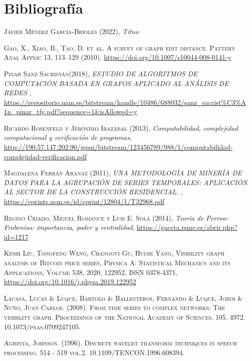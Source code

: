 \documentclass[12pt,a4paper]{article}
\begin{document}
	\section{Bibliografía}
	 \renewcommand\refname{}
\begin{thebibliography}{X}


 \textsc{Javier Méndez García-Brioles} \textsc{(2022)},
\textit{Tituo}

 \textsc{Gao, X., Xiao, B., Tao, D. et al. A survey of graph edit distance. Pattern Anal Applic 13, 113–129 (2010).} \url{https://doi.org/10.1007/s10044-008-0141-y}

 \textsc{ Pinar Sanz Sacristán}\textsc{(2018)},
\textit{ESTUDIO DE ALGORITMOS DE
COMPUTACIÓN BASADA EN
GRAFOS APLICADO AL
ANÁLISIS DE REDES
}, \url{https://repositorio.uam.es/bitstream/handle/10486/688032/sanz_sacrist%C3%A1n_pinar_tfg.pdf?sequence=1&isAllowed=y}

 \textsc{Ricardo Rosenfeld y Jerónimo Irazábal} \textsc{(2013)},
\textit{Computabilidad, complejidad
computacional y verificación
de programas}, \url{http://190.57.147.202:90/jspui/bitstream/123456789/988/1/computabilidad-complejidad-verificacion.pdf}

 \textsc{Magdalena Ferrán Aranaz} \textsc{(2011)},
\textit{UNA METODOLOGÍA DE MINERÍA DE DATOS
PARA LA AGRUPACIÓN DE SERIES
TEMPORALES: APLICACIÓN AL SECTOR DE LA
CONSTRUCCIÓN RESIDENCIAL. 
}, \url{https://eprints.ucm.es/id/eprint/12804/1/T32968.pdf}

 \textsc{Regino Criado, Miguel Romance y Luis E. Solá} \textsc{(2014)},
\textit{Teoría de Perron-Frobenius:
importancia, poder y centralidad}, \url{https://gaceta.rsme.es/abrir.php?id=1217}

 \textsc{Keshi Liu, Tongfeng Weng, Changgui Gu, Huijie Yang,
Visibility graph analysis of Bitcoin price series,
Physica A: Statistical Mechanics and its Applications,
Volume 538,
2020,
122952,
ISSN 0378-4371,}
\url{https://doi.org/10.1016/j.physa.2019.122952}

 \textsc{Lacasa, Lucas \& Luque, Bartolo \& Ballesteros, Fernando \& Luque, Jordi \& Nuño, Juan Carlos. (2008). From time series to complex networks: The visibility graph. Proceedings of the National Academy of Sciences. 105. 4972. 10.1073/pnas.0709247105.}

 \textsc{Agbinya, Johnson. (1996). Discrete wavelet transform techniques in speech processing. 514 - 519 vol.2. 10.1109/TENCON.1996.608394. }


\end{thebibliography}
\end{document}
